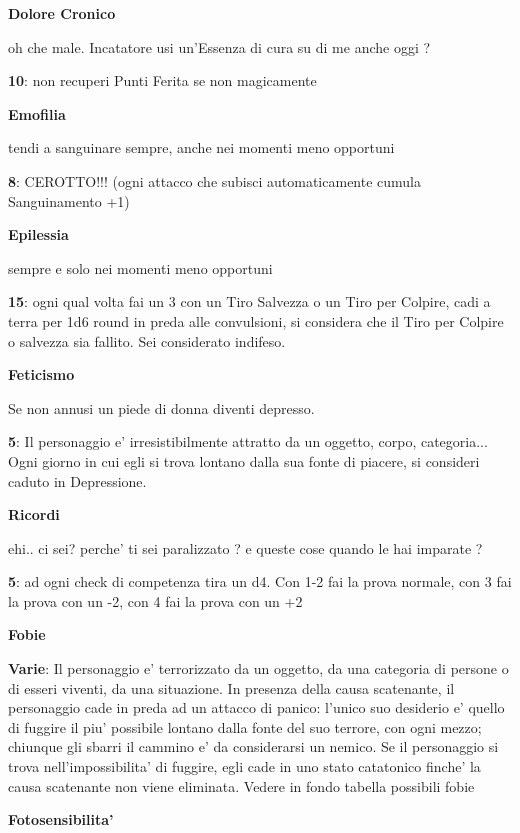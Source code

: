 \documentclass[a4paper,11pt,twoside,openany]{book}
\begin{document}
{		\textbf{Dolore Cronico}
		
		oh che male. Incatatore usi un'Essenza di cura su di me anche oggi ?
		
		\textbf{10}: non recuperi Punti Ferita se non magicamente
		
		\textbf{Emofilia}
		
		tendi a sanguinare sempre, anche nei momenti meno opportuni
		
		\textbf{8}: CEROTTO!!! (ogni attacco che subisci automaticamente cumula Sanguinamento +1)
		
		\textbf{Epilessia}
		
		sempre e solo nei momenti meno opportuni
		
		\textbf{15}: ogni qual volta fai un 3 con un Tiro Salvezza o un Tiro per Colpire, cadi a terra per 1d6 round in preda alle convulsioni, si considera che il Tiro per Colpire o salvezza sia fallito. Sei considerato indifeso.
		
		\textbf{Feticismo}
		
		Se non annusi un piede di donna diventi depresso.
		
		\textbf{5}: Il personaggio e' irresistibilmente attratto da un oggetto, corpo, categoria... Ogni giorno in cui egli si trova lontano dalla sua fonte di piacere, si consideri caduto in Depressione.
		
		\textbf{Ricordi}
		
		ehi.. ci sei? perche' ti sei paralizzato ? e queste cose quando le hai imparate ?
		
		\textbf{5}: ad ogni check di competenza tira un d4. Con 1-2 fai la prova normale, con 3 fai la prova con un -2, con 4 fai la prova con un +2
		
		\textbf{Fobie}
		
		\textbf{Varie}: Il personaggio e' terrorizzato da un oggetto, da una categoria di persone o di esseri viventi, da una situazione. In presenza della causa scatenante, il personaggio cade in preda ad un attacco di panico: l'unico suo desiderio e' quello di fuggire il piu' possibile lontano dalla fonte del suo terrore, con ogni mezzo; chiunque gli sbarri il cammino e' da considerarsi un nemico. Se il personaggio si trova nell'impossibilita' di fuggire, egli cade in uno stato catatonico finche' la causa scatenante non viene eliminata. Vedere in fondo tabella possibili fobie
		
		\textbf{Fotosensibilita'}
		
}
\end{document}

